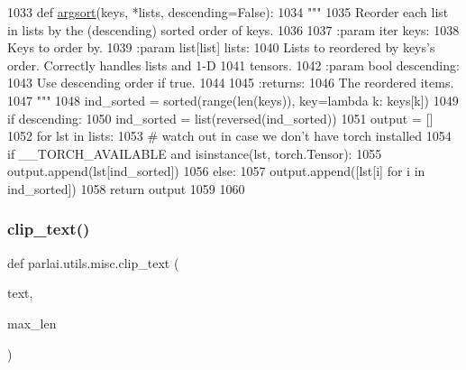 \begin{DoxyCode}
1033 \textcolor{keyword}{def }\hyperlink{namespaceparlai_1_1utils_1_1misc_a9e330c9119522333c738a3175e0b4396}{argsort}(keys, *lists, descending=False):
1034     \textcolor{stringliteral}{"""}
1035 \textcolor{stringliteral}{    Reorder each list in lists by the (descending) sorted order of keys.}
1036 \textcolor{stringliteral}{}
1037 \textcolor{stringliteral}{    :param iter keys:}
1038 \textcolor{stringliteral}{        Keys to order by.}
1039 \textcolor{stringliteral}{    :param list[list] lists:}
1040 \textcolor{stringliteral}{        Lists to reordered by keys's order.  Correctly handles lists and 1-D}
1041 \textcolor{stringliteral}{        tensors.}
1042 \textcolor{stringliteral}{    :param bool descending:}
1043 \textcolor{stringliteral}{        Use descending order if true.}
1044 \textcolor{stringliteral}{}
1045 \textcolor{stringliteral}{    :returns:}
1046 \textcolor{stringliteral}{        The reordered items.}
1047 \textcolor{stringliteral}{    """}
1048     ind\_sorted = sorted(range(len(keys)), key=\textcolor{keyword}{lambda} k: keys[k])
1049     \textcolor{keywordflow}{if} descending:
1050         ind\_sorted = list(reversed(ind\_sorted))
1051     output = []
1052     \textcolor{keywordflow}{for} lst \textcolor{keywordflow}{in} lists:
1053         \textcolor{comment}{# watch out in case we don't have torch installed}
1054         \textcolor{keywordflow}{if} \_\_TORCH\_AVAILABLE \textcolor{keywordflow}{and} isinstance(lst, torch.Tensor):
1055             output.append(lst[ind\_sorted])
1056         \textcolor{keywordflow}{else}:
1057             output.append([lst[i] \textcolor{keywordflow}{for} i \textcolor{keywordflow}{in} ind\_sorted])
1058     \textcolor{keywordflow}{return} output
1059 
1060 
\end{DoxyCode}
\mbox{\label{namespaceparlai_1_1utils_1_1misc_a219b248f4399036a381ca859aa97433e}} 
\subsubsection{\texorpdfstring{clip\+\_\+text()}{clip\_text()}}
{\footnotesize\ttfamily def parlai.\+utils.\+misc.\+clip\+\_\+text (\begin{DoxyParamCaption}\item[{}]{text,  }\item[{}]{max\+\_\+len }\end{DoxyParamCaption})}

